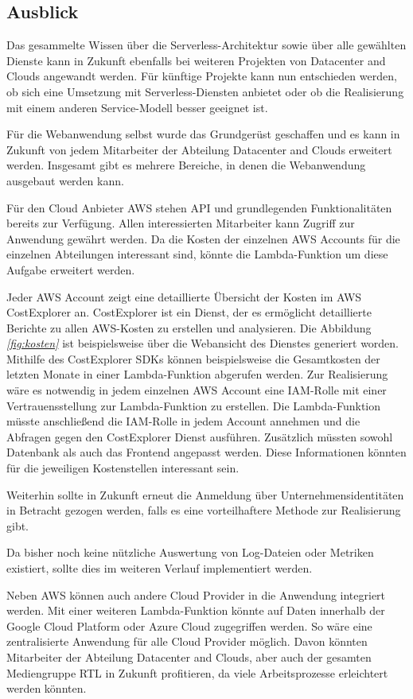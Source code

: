 \subsection{Ausblick}
Das gesammelte Wissen über die Serverless-Architektur sowie über alle gewählten Dienste kann in Zukunft ebenfalls bei weiteren Projekten von Datacenter and Clouds angewandt werden.
Für künftige Projekte kann nun entschieden werden, ob sich eine Umsetzung mit Serverless-Diensten anbietet oder ob die Realisierung mit einem anderen Service-Modell besser geeignet ist.

Für die Webanwendung selbst wurde das Grundgerüst geschaffen und es kann in Zukunft von jedem Mitarbeiter der Abteilung Datacenter and Clouds erweitert werden.
Insgesamt gibt es mehrere Bereiche, in denen die Webanwendung ausgebaut werden kann.

Für den Cloud Anbieter AWS stehen API und grundlegenden Funktionalitäten bereits zur Verfügung.
Allen interessierten Mitarbeiter kann Zugriff zur Anwendung gewährt werden.
Da die Kosten der einzelnen AWS Accounts für die einzelnen Abteilungen interessant sind, könnte die Lambda-Funktion um diese Aufgabe erweitert werden.

Jeder AWS Account zeigt eine detaillierte Übersicht der Kosten im AWS CostExplorer an.
CostExplorer ist ein Dienst, der es ermöglicht detaillierte Berichte zu allen AWS-Kosten zu erstellen und analysieren.
Die Abbildung \textit{\ref{fig:kosten} } ist beispielsweise über die Webansicht des Dienstes generiert worden.
Mithilfe des CostExplorer SDKs können beispielsweise die Gesamtkosten der letzten Monate in einer Lambda-Funktion abgerufen werden.
Zur Realisierung wäre es notwendig in jedem einzelnen AWS Account eine IAM-Rolle mit einer Vertrauensstellung zur Lambda-Funktion zu erstellen.
Die Lambda-Funktion müsste anschließend die IAM-Rolle in jedem Account annehmen und die Abfragen gegen den CostExplorer Dienst ausführen.
Zusätzlich müssten sowohl Datenbank als auch das Frontend angepasst werden.
Diese Informationen könnten für die jeweiligen Kostenstellen interessant sein.

Weiterhin sollte in Zukunft erneut die Anmeldung über Unternehmensidentitäten in Betracht gezogen werden, falls es eine vorteilhaftere Methode zur Realisierung gibt.

Da bisher noch keine nützliche Auswertung von Log-Dateien oder Metriken existiert, sollte dies im weiteren Verlauf implementiert werden.

Neben AWS können auch andere Cloud Provider in die Anwendung integriert werden.
Mit einer weiteren Lambda-Funktion könnte auf Daten innerhalb der Google Cloud Platform oder Azure Cloud zugegriffen werden.
So wäre eine zentralisierte Anwendung für alle Cloud Provider möglich.
Davon könnten Mitarbeiter der Abteilung Datacenter and Clouds, aber auch der gesamten Mediengruppe RTL in Zukunft profitieren, da viele Arbeitsprozesse erleichtert werden könnten.















